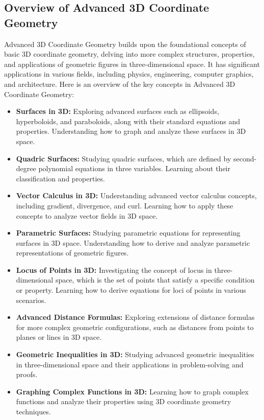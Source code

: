 \documentclass[openany]{book}
\begin{document}
\subsection{Overview of Advanced 3D Coordinate Geometry}
Advanced 3D Coordinate Geometry builds upon the foundational concepts of basic 3D coordinate geometry, delving into more complex structures, properties, and applications of geometric figures in three-dimensional space. It has significant applications in various fields, including physics, engineering, computer graphics, and architecture. Here is an overview of the key concepts in Advanced 3D Coordinate Geometry:
\begin{itemize}
    \item \textbf{Surfaces in 3D:} Exploring advanced surfaces such as ellipsoids, hyperboloids, and paraboloids, along with their standard equations and properties. Understanding how to graph and analyze these surfaces in 3D space.
    \item \textbf{Quadric Surfaces:} Studying quadric surfaces, which are defined by second-degree polynomial equations in three variables. Learning about their classification and properties.
    \item \textbf{Vector Calculus in 3D:} Understanding advanced vector calculus concepts, including gradient, divergence, and curl. Learning how to apply these concepts to analyze vector fields in 3D space.
    \item \textbf{Parametric Surfaces:} Studying parametric equations for representing surfaces in 3D space. Understanding how to derive and analyze parametric representations of geometric figures.
    \item \textbf{Locus of Points in 3D:} Investigating the concept of locus in three-dimensional space, which is the set of points that satisfy a specific condition or property. Learning how to derive equations for loci of points in various scenarios.
    \item \textbf{Advanced Distance Formulas:} Exploring extensions of distance formulas for more complex geometric configurations, such as distances from points to planes or lines in 3D space.
    \item \textbf{Geometric Inequalities in 3D:} Studying advanced geometric inequalities in three-dimensional space and their applications in problem-solving and proofs.
    \item \textbf{Graphing Complex Functions in 3D:} Learning how to graph complex functions and analyze their properties using 3D coordinate geometry techniques.

\end{itemize}
\end{document}
